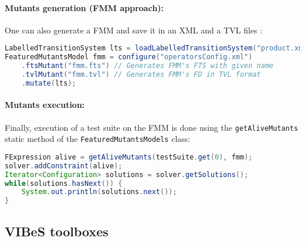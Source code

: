 \paragraph{Mutants generation (\gls{FMM} approach):}

One can also generate a \gls{FMM} and save it in an XML and a \gls{TVL} files :
%
\begin{lstlisting}[language=Java,frame=single,numbers=none]
LabelledTransitionSystem lts = loadLabelledTransitionSystem("product.xml");
FeaturedMutantsModel fmm = configure("operatorsConfig.xml")
	.ftsMutant("fmm.fts") // Generates FMM's FTS with given name
	.tvlMutant("fmm.tvl") // Generates FMM's FD in TVL format
	.mutate(lts);
\end{lstlisting}
%

\paragraph{Mutants execution:}

Finally, execution of a test suite on the \gls{FMM} is done using the \texttt{get\-Alive\-Mu\-tants} static method of the \texttt{Fea\-tu\-red\-Mu\-tants\-Mo\-dels} class:
%
\begin{lstlisting}[language=Java,frame=single,numbers=none]
FExpression alive = getAliveMutants(testSuite.get(0), fmm);
solver.addConstraint(alive);
Iterator<Configuration> solutions = solver.getSolutions();
while(solutions.hasNext()) {
	System.out.println(solutions.next());
}
\end{lstlisting}
%

\subsection{\gls{VIBeS} toolboxes}

